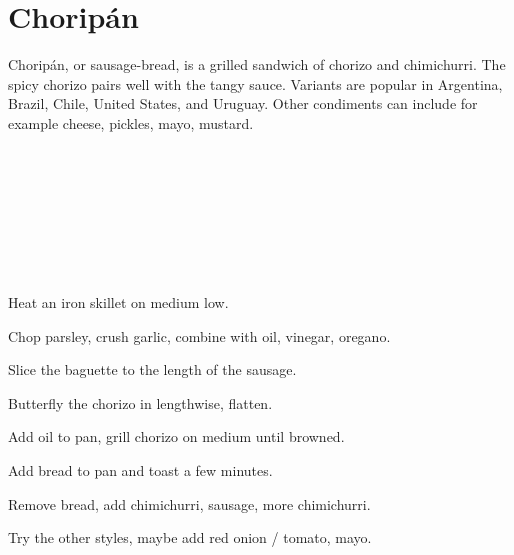 \section{Chorip\'{a}n}

\begin{recipestats}[
        servings=1,
        preptime=5~\minute,
        bakingtime=15~\minute,
        source=Mike,
        original=\citefield{wikiChoripan}{title}~\cite{wikiChoripan},
    ]
\end{recipestats}

\begin{recipeabstract}
    Chorip\'{a}n, or sausage-bread, is a grilled sandwich of chorizo and chimichurri.
    The spicy chorizo pairs well with the tangy sauce.
    Variants are popular in Argentina, Brazil, Chile, United States, and Uruguay.
    Other condiments can include for example cheese, pickles, mayo, mustard.
\end{recipeabstract}

\begin{ingredientcolumns}
    \begin{ingredientblock}
        \\
        \\
        \\
    \end{ingredientblock}
    \begin{ingredientblock}
        \\
        \\
        \\
    \end{ingredientblock}
\end{ingredientcolumns}

\begin{preparation}
\item Heat an iron skillet on medium low.
\item Chop parsley, crush garlic,
    combine with oil, vinegar, oregano.
\item Slice the baguette to the length of the sausage.
\item Butterfly the chorizo in lengthwise, flatten.
\item Add oil to pan, grill chorizo on medium until browned.
\item Add bread to pan and toast a few minutes.
\item Remove bread, add chimichurri, sausage, more chimichurri.
\end{preparation}

\begin{experiments}
\item Try the other styles, maybe add red onion / tomato, mayo.
\end{experiments}

\recipeend%
